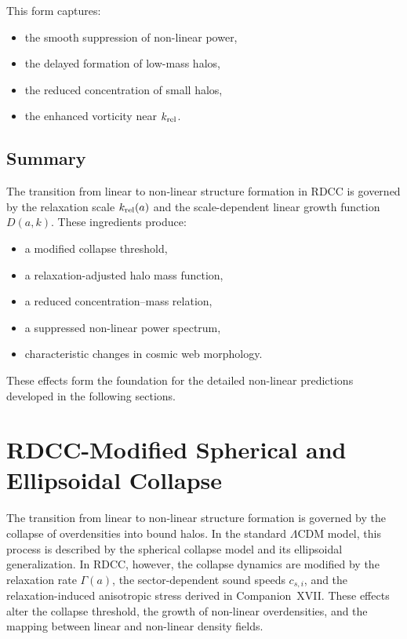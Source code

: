 \documentclass[11pt,a4paper]{article}
\begin{document}
This form captures:
\begin{itemize}
\item the smooth suppression of non-linear power,
\item the delayed formation of low-mass halos,
\item the reduced concentration of small halos,
\item the enhanced vorticity near $k_{\rm rel}$.
\end{itemize}

\subsection{Summary}

The transition from linear to non-linear structure formation in RDCC is governed by the
relaxation scale $k_{\rm rel}(a)$ and the scale-dependent linear growth function $D(a,k)$.
These ingredients produce:
\begin{itemize}
\item a modified collapse threshold,
\item a relaxation-adjusted halo mass function,
\item a reduced concentration--mass relation,
\item a suppressed non-linear power spectrum,
\item characteristic changes in cosmic web morphology.
\end{itemize}

These effects form the foundation for the detailed non-linear predictions developed in the
following sections.
\section{RDCC-Modified Spherical and Ellipsoidal Collapse}

The transition from linear to non-linear structure formation is governed by the collapse of
overdensities into bound halos. In the standard $\Lambda$CDM model, this process is described
by the spherical collapse model and its ellipsoidal generalization. In RDCC, however, the
collapse dynamics are modified by the relaxation rate $\Gamma(a)$, the sector-dependent sound
speeds $c_{s,i}$, and the relaxation-induced anisotropic stress derived in Companion~XVII.
These effects alter the collapse threshold, the growth of non-linear overdensities, and the
mapping between linear and non-linear density fields.
\end{document}
